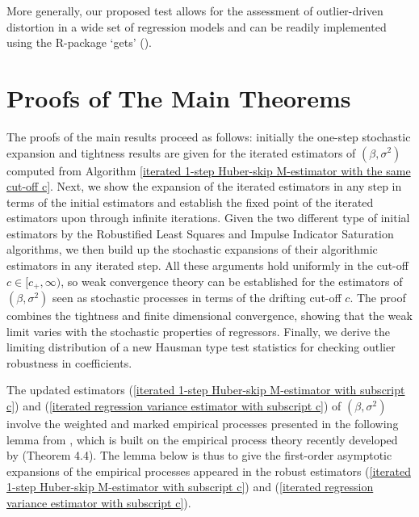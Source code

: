 \documentclass[11pt, letterpaper]{article}
\numberwithin{algorithm}{section}
\numberwithin{assumption}{section}
\numberwithin{lemma}{section}
\numberwithin{theorem}{section}
\numberwithin{corollary}{section}
\numberwithin{remark}{section}
\numberwithin{equation}{section}
\numberwithin{figure}{section}
\numberwithin{table}{section}
\newcommand{\ignore}[1]{}
\begin{document}
\ignore{More results}

More generally, our proposed test allows for the assessment of outlier-driven distortion in a wide set of regression models and can be readily implemented using the R-package `gets' (\citealt{pretis2018automated}).

\newpage
\linespread{1} \selectfont




\newpage
\appendix
\section{Proofs of The Main Theorems} \label{sec_proofs}
The proofs of the main results proceed as follows: initially the one-step stochastic expansion and tightness results are given for the iterated estimators of $(\beta, \sigma^{2})$ computed from Algorithm \ref{iterated 1-step Huber-skip M-estimator with the same cut-off c}. Next, we show the expansion of the iterated estimators in any step in terms of the initial estimators and establish the fixed point of the iterated estimators upon through infinite iterations. Given the two different type of initial estimators by the Robustified Least Squares and Impulse Indicator Saturation algorithms, we then build up the stochastic expansions of their algorithmic estimators in any iterated step. All these arguments hold uniformly in the cut-off $c \in [c_{+}, \infty)$, so weak convergence theory can be established for the estimators of $(\beta, \sigma^{2})$ seen as stochastic processes in terms of the drifting cut-off $c$. The proof combines the tightness and finite dimensional convergence, showing that the weak limit varies with the stochastic properties of regressors. Finally, we derive the limiting distribution of a new Hausman type test statistics for checking outlier robustness in coefficients.

The updated estimators (\ref{iterated 1-step Huber-skip M-estimator with subscript c}) and (\ref{iterated regression variance estimator with subscript c}) of $(\beta, \sigma^{2})$ involve the weighted and marked empirical processes presented in the following lemma from \cite{jiao2018testing}, which is built on the empirical process theory recently developed by \cite{berenguer2019analysis} (Theorem 4.4). The lemma below is thus to give the first-order asymptotic expansions of the empirical processes appeared in the robust estimators (\ref{iterated 1-step Huber-skip M-estimator with subscript c}) and (\ref{iterated regression variance estimator with subscript c}).
\end{document}
